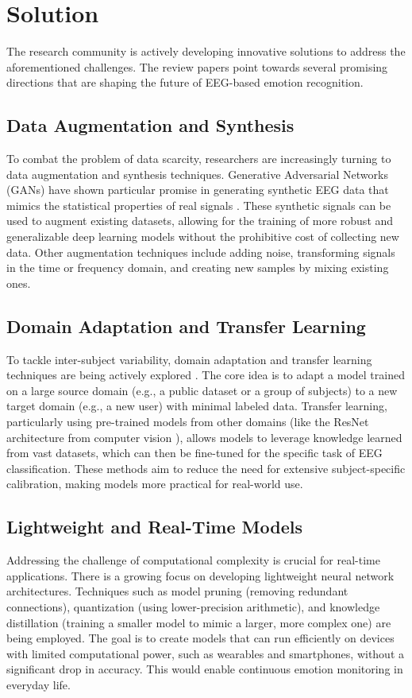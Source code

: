 \documentclass[conference]{IEEEtran}
\begin{document}
\section{Solution}
The research community is actively developing innovative solutions to address the aforementioned challenges. The review papers point towards several promising directions that are shaping the future of EEG-based emotion recognition.

\subsection*{Data Augmentation and Synthesis}
To combat the problem of data scarcity, researchers are increasingly turning to data augmentation and synthesis techniques. Generative Adversarial Networks (GANs) have shown particular promise in generating synthetic EEG data that mimics the statistical properties of real signals \cite{b8}. These synthetic signals can be used to augment existing datasets, allowing for the training of more robust and generalizable deep learning models without the prohibitive cost of collecting new data. Other augmentation techniques include adding noise, transforming signals in the time or frequency domain, and creating new samples by mixing existing ones.

\subsection*{Domain Adaptation and Transfer Learning}
To tackle inter-subject variability, domain adaptation and transfer learning techniques are being actively explored \cite{b7}. The core idea is to adapt a model trained on a large source domain (e.g., a public dataset or a group of subjects) to a new target domain (e.g., a new user) with minimal labeled data. Transfer learning, particularly using pre-trained models from other domains (like the ResNet architecture from computer vision \cite{b1}), allows models to leverage knowledge learned from vast datasets, which can then be fine-tuned for the specific task of EEG classification. These methods aim to reduce the need for extensive subject-specific calibration, making models more practical for real-world use.

\subsection*{Lightweight and Real-Time Models}
Addressing the challenge of computational complexity is crucial for real-time applications. There is a growing focus on developing lightweight neural network architectures. Techniques such as model pruning (removing redundant connections), quantization (using lower-precision arithmetic), and knowledge distillation (training a smaller model to mimic a larger, more complex one) are being employed. The goal is to create models that can run efficiently on devices with limited computational power, such as wearables and smartphones, without a significant drop in accuracy. This would enable continuous emotion monitoring in everyday life.
\end{document}
